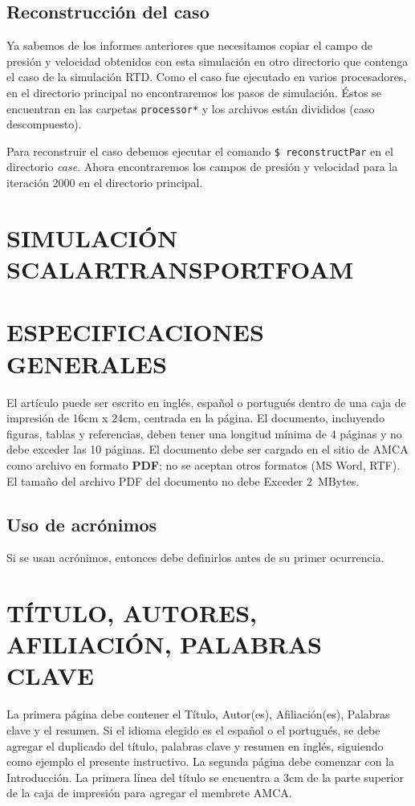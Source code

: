 \documentclass[oneside,a4paper,spanish,links]{amca}
\begin{document}
\subsection{Reconstrucción del caso}
Ya sabemos de los informes anteriores que necesitamos copiar el campo de presión y velocidad obtenidos con esta simulación en otro directorio que contenga el caso de la simulación RTD. Como el caso fue ejecutado en varios procesadores, en el directorio principal no encontraremos los pasos de simulación. Éstos se encuentran en las carpetas \texttt{processor*} y los archivos están divididos (caso descompuesto).

Para reconstruir el caso debemos ejecutar el comando \texttt{\$ reconstructPar} en el directorio \textit{case}. Ahora encontraremos los campos de presión y velocidad para la iteración 2000 en el directorio principal.

\section{SIMULACIÓN SCALARTRANSPORTFOAM}


\section{ESPECIFICACIONES GENERALES}

El artículo puede ser escrito en inglés, español o portugués
dentro de una caja de impresión de 16cm x 24cm, centrada en la
página. El documento, incluyendo figuras, tablas y referencias,
deben tener una longitud mínima de 4 páginas y no debe exceder las
10 páginas. El documento debe ser cargado en el sitio de AMCA como
archivo en formato \textbf {PDF}; no se aceptan otros formatos (MS
Word, RTF). El tamaño del archivo PDF del documento no debe
Exceder 2~MBytes.

\subsection{Uso de acrónimos}

Si se usan acrónimos, entonces debe definirlos antes de su primer ocurrencia.

\section{TÍTULO, AUTORES, AFILIACIÓN, PALABRAS CLAVE}

La primera página debe contener el Título, Autor(es),
Afiliación(es), Palabras clave y el resumen. Si el idioma elegido
es el español o el portugués, se debe agregar el duplicado del
título, palabras clave y resumen en inglés, siguiendo como ejemplo
el presente instructivo. La segunda página debe comenzar con la
Introducción. La primera línea del título se encuentra a 3cm de la
parte superior de la caja de impresión para agregar el membrete
AMCA.
\end{document}
